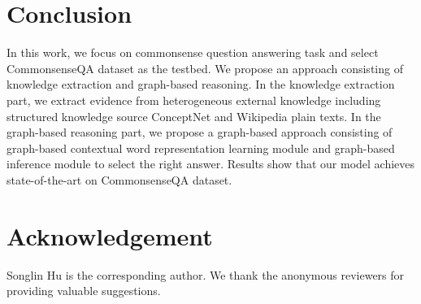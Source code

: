 \documentclass[letterpaper]{article} \usepackage{aaai20}  \usepackage{times}  \usepackage{helvet} \usepackage{courier}  \usepackage[hyphens]{url}  \usepackage{graphicx} \urlstyle{rm} \def\UrlFont{\rm}  \usepackage{graphicx}  \frenchspacing  \setlength{\pdfpagewidth}{8.5in}  \setlength{\pdfpageheight}{11in}
\begin{document}
\section{Conclusion}
In this work, we focus on commonsense question answering task and select CommonsenseQA \cite{talmor2019commonsenseqa} dataset as the testbed. 
We propose an approach consisting of knowledge extraction and graph-based reasoning. In the knowledge extraction part, we extract evidence from heterogeneous external knowledge including structured knowledge source ConceptNet and  Wikipedia plain texts. 
In the graph-based reasoning part, we propose a graph-based  approach  consisting  of  graph-based  contextual  word representation  learning  module  and  graph-based  inference module to select the right answer. Results show that our model achieves state-of-the-art on CommonsenseQA\cite{talmor2019commonsenseqa} dataset.



\section{Acknowledgement}
Songlin Hu is the corresponding author. We thank the anonymous reviewers for providing valuable suggestions.




\end{document}
